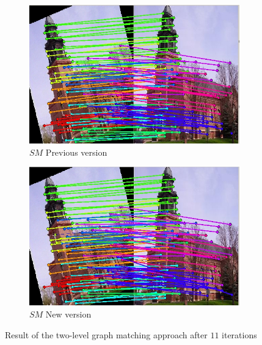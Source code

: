 \documentclass[
	fontsize=12pt,
	paper=a4,
	twoside=false,
	numbers=noenddot,
	plainheadsepline,
	toc=listof,
	toc=bibliography
]{scrartcl}
\begin{document}
\begin{figure}[ht] 
	\begin{subfigure}[b]{0.5\textwidth}
		\centering
		\includegraphics[scale=0.35]{fig/method1/test2/LL_it11.jpg} 
		\caption{$SM$ Previous version} 
	\end{subfigure}%
	\begin{subfigure}[b]{0.5\textwidth}
		\centering
		\includegraphics[scale=0.35]{test2/it11.jpg} 
		\caption{$SM$ New version} 
	\end{subfigure} 
	\caption{Result of the two-level graph matching approach after $11$ iterations }	
\end{figure}
\end{document}
